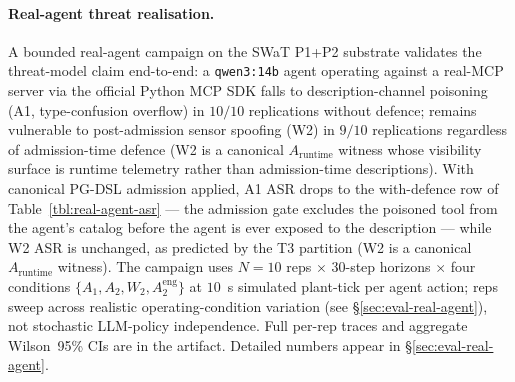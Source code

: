 \paragraph{Real-agent threat realisation.}
A bounded real-agent campaign on the SWaT P1+P2 substrate validates
the threat-model claim end-to-end: a \texttt{qwen3:14b} agent
operating against a real-MCP server via the official Python MCP SDK
falls to description-channel poisoning (A1, type-confusion overflow)
in $10/10$ replications without defence; remains vulnerable to
post-admission sensor spoofing (W2) in $9/10$ replications regardless
of admission-time defence (W2 is a canonical $A_{\text{runtime}}$
witness whose visibility surface is runtime telemetry rather than
admission-time descriptions). With
canonical PG-DSL admission applied, A1 ASR drops to the with-defence
row of Table~\ref{tbl:real-agent-asr} --- the admission gate excludes
the poisoned tool from the agent's catalog before the agent is ever
exposed to the description --- while W2 ASR is unchanged, as
predicted by the T3 partition (W2 is a canonical $A_{\text{runtime}}$
witness). The campaign uses $N=10$ reps $\times$ $30$-step horizons
$\times$ four conditions $\{A_1, A_2, W_2, A_2^{\text{eng}}\}$ at
$10$~s simulated plant-tick per agent action; reps sweep across
realistic operating-condition variation (see \S\ref{sec:eval-real-agent}),
not stochastic LLM-policy independence. Full per-rep traces and
aggregate Wilson~95\% CIs are in the artifact. Detailed numbers
appear in \S\ref{sec:eval-real-agent}.

